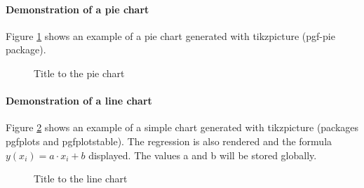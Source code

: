 \paragraph{Demonstration of a pie chart}
Figure \ref{fig:PieChart} shows an example of a pie chart generated with tikzpicture (pgf-pie package).

\begin{figure}
	\centering
	\caption{\label{fig:PieChart}Title to the pie chart}
\end{figure}

\paragraph{Demonstration of a line chart}
Figure \ref{fig:LineChart} shows an example of a simple chart generated with tikzpicture (packages pgfplots and pgfplotstable). 
The regression is also rendered and the formula $ y(x_i) = a \cdot x_i + b$ displayed. The values a and b will be stored globally.

\begin{figure}
	\centering
	\caption{\label{fig:LineChart}Title to the line chart}
\end{figure}


